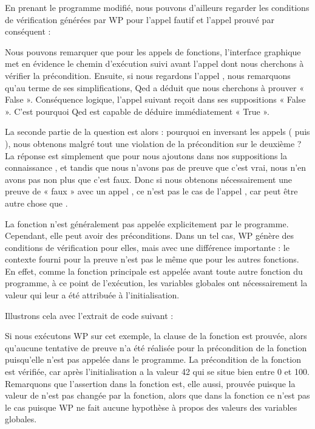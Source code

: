En prenant le programme modifié, nous pouvons d'ailleurs regarder les conditions
de vérification générées par WP pour l'appel fautif et l'appel prouvé par
conséquent :







Nous pouvons remarquer que pour les appels de fonctions, l'interface graphique
met en évidence le chemin d'exécution suivi avant l'appel dont nous cherchons à
vérifier la précondition. Ensuite, si nous regardons l'appel ,
nous remarquons qu'au terme de ses simplifications, Qed a déduit que nous
cherchons à prouver « False ». Conséquence logique, l'appel suivant 
reçoit dans ses suppositions « False ». C'est pourquoi Qed est capable de déduire
immédiatement « True ».



La seconde partie de la question est alors : pourquoi en inversant les
appels ( puis ), nous obtenons
malgré tout une violation de la précondition sur le deuxième ? La réponse est
simplement que pour  nous ajoutons dans nos suppositions la
connaissance , et tandis que nous n'avons pas de preuve
que c'est vrai, nous n'en avons pas non plus que c'est faux. Donc si nous obtenons
nécessairement une preuve de « faux » avec un appel , ce n'est
pas le cas de l'appel , car  peut être autre
chose que .




La fonction  n'est généralement pas appelée explicitement par le
programme. Cependant, elle peut avoir des préconditions. Dans un tel cas, WP
génère des conditions de vérification pour elles, mais avec une différence
importante : le contexte fourni pour la preuve n'est pas le même que pour les
autres fonctions. En effet, comme la fonction principale est appelée avant toute
autre fonction du programme, à ce point de l'exécution, les variables globales
ont nécessairement la valeur qui leur a été attribuée à l'initialisation.


Illustrons cela avec l'extrait de code suivant :




Si nous exécutons WP sur cet exemple, la clause  de la
fonction  est prouvée, alors qu'aucune tentative de preuve n'a
été réalisée pour la précondition de la fonction  puisqu'elle
n'est pas appelée dans le programme. La précondition de la fonction
 est vérifiée, car après l'initialisation  a la
valeur 42 qui se situe bien entre 0 et 100. Remarquons que l'assertion dans
la fonction  est, elle aussi, prouvée puisque la valeur de
 n'est pas changée par la fonction, alors que dans la fonction
 ce n'est pas le cas puisque WP ne fait aucune hypothèse à
propos des valeurs des variables globales.



